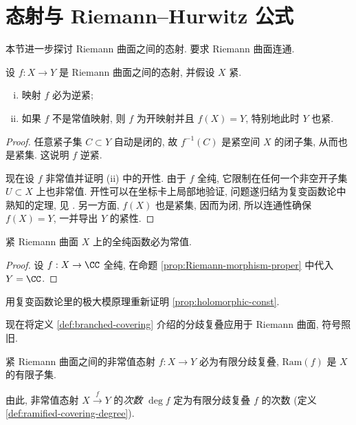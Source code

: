 \section{态射与 Riemann--Hurwitz 公式}\label{sec:Riemann-Hurwitz}
本节进一步探讨 Riemann 曲面之间的态射. 要求 Riemann 曲面连通.
\begin{proposition}\label{prop:Riemann-morphism-proper}
	设 $f: X \to Y$ 是 Riemann 曲面之间的态射, 并假设 $X$ 紧.
	\begin{enumerate}[(i)]
		\item 映射 $f$ 必为逆紧;
		\item 如果 $f$ 不是常值映射, 则 $f$ 为开映射并且 $f(X) = Y$, 特别地此时 $Y$ 也紧.
	\end{enumerate}
\end{proposition}
\begin{proof}
	任意紧子集 $C \subset Y$ 自动是闭的, 故 $f^{-1}(C)$ 是紧空间 $X$ 的闭子集, 从而也是紧集. 这说明 $f$ 逆紧.
	
	现在设 $f$ 非常值并证明 (ii) 中的开性. 由于 $f$ 全纯, 它限制在任何一个非空开子集 $U \subset X$ 上也非常值. 开性可以在坐标卡上局部地验证, 问题遂归结为复变函数论中熟知的定理, 见 \cite[\S 3.4, 定理 3]{TW06} . 另一方面, $f(X)$ 也是紧集, 因而为闭, 所以连通性确保 $f(X)=Y$, 一并导出 $Y$ 的紧性.
\end{proof}

\begin{proposition}\label{prop:holomorphic-const}
	紧 Riemann 曲面 $X$ 上的全纯函数必为常值.
\end{proposition}
\begin{proof}
	设 $f: X \to \CC$ 全纯, 在命题 \ref{prop:Riemann-morphism-proper} 中代入 $Y = \CC$.
\end{proof}

\begin{exercise}
	用复变函数论里的极大模原理重新证明 \ref{prop:holomorphic-const}.
\end{exercise}

现在将定义 \ref{def:branched-covering} 介绍的分歧复叠应用于 Riemann 曲面, 符号照旧.

\begin{proposition}\label{prop:morphism-ramified-covering}
	紧 Riemann 曲面之间的非常值态射 $f: X \to Y$ 必为有限分歧复叠, $\mathrm{Ram}(f)$ 是 $X$ 的有限子集.
\end{proposition}

由此, 非常值态射 $X \xrightarrow{f} Y$ 的\emph{次数} $\deg f$ 定为有限分歧复叠 $f$ 的次数 (定义 \ref{def:ramified-covering-degree}).

